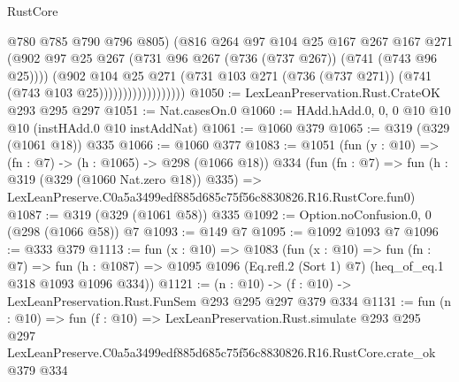 \begin{lexlean}{RustCore}
\begin{coremodule}
                                @780
                                @785
                                @790
                                @796
                                @805)
                              (@816
                                @264
                                @97
                                @104
                                @25
                                @167
                                @267
                                @167
                                @271
                                (@902
                                  @97
                                  @25
                                  @267
                                  (@731 @96 @267 (@736 (@737 @267)) (@741 (@743 @96 @25))))
                                (@902
                                  @104
                                  @25
                                  @271
                                  (@731
                                    @103
                                    @271
                                    (@736 (@737 @271))
                                    (@741 (@743 @103 @25))))))))))))))))))
@1050 := LexLeanPreservation.Rust.CrateOK @293 @295 @297
@1051 := Nat.casesOn.{0}
@1060 := HAdd.hAdd.{0, 0, 0} @10 @10 @10 (instHAdd.{0} @10 instAddNat)
@1061 := @1060 @379
@1065 := @319 (@329 (@1061 @18)) @335
@1066 := @1060 @377
@1083 := @1051
    (fun (y : @10) => (fn : @7) -> (h : @1065) -> @298 (@1066 @18))
    @334
    (fun (fn : @7) =>
    fun (h : @319 (@329 (@1060 Nat.zero @18)) @335) =>
    LexLeanPreserve.C0a5a3499edf885d685c75f56c8830826.R16.RustCore.fun0)
@1087 := @319 (@329 (@1061 @58)) @335
@1092 := Option.noConfusion.{0, 0} (@298 (@1066 @58)) @7
@1093 := @149 @7
@1095 := @1092 @1093 @7
@1096 := @333 @379
@1113 := fun (x : @10) =>
  @1083
    (fun (x : @10) =>
    fun (fn : @7) =>
    fun (h : @1087) => @1095 @1096 (Eq.refl.{2} (Sort 1) @7) (heq_of_eq.{1} @318 @1093 @1096 @334))
@1121 := (n : @10) -> (f : @10) -> LexLeanPreservation.Rust.FunSem @293 @295 @297 @379 @334
@1131 := fun (n : @10) =>
  fun (f : @10) =>
  LexLeanPreservation.Rust.simulate
    @293
    @295
    @297
    LexLeanPreserve.C0a5a3499edf885d685c75f56c8830826.R16.RustCore.crate_ok
    @379
    @334
\end{coremodule}
\end{lexlean}
